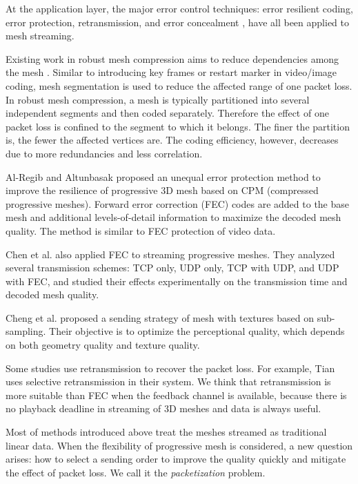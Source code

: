     At the application layer, the major error control techniques: error
    resilient coding, error protection, retransmission, and error
    concealment \cite{Park2003}, have all been applied to mesh streaming.  
    
    Existing work in robust mesh compression aims to
    reduce dependencies among the mesh \cite{error:Park,error:Yan}.
    Similar to introducing key frames or restart marker in video/image
    coding, mesh segmentation is used to reduce the affected range of one
    packet loss. In robust mesh compression, a mesh is typically
    partitioned into several independent segments and then coded separately.
    Therefore the effect of one packet loss is confined to the segment to which
    it belongs. The finer the partition is, the fewer the affected vertices
    are.  The coding efficiency, however, decreases
    due to more redundancies and less correlation.

    Al-Regib and Altunbasak \cite{unequal:Al-Regib} proposed an
    unequal error protection method to improve the resilience of
    progressive 3D mesh based on CPM (compressed progressive meshes). 
    Forward error correction (FEC) codes are added to the
    base mesh and additional levels-of-detail information to maximize 
    the decoded mesh quality.  The method is similar to FEC protection 
    of video data.

    Chen et al. \cite{chen05hybrid} also applied FEC to streaming
    progressive meshes. They analyzed several transmission schemes:
    TCP only, UDP only, TCP with UDP, and UDP with FEC, and studied
    their effects experimentally on the transmission time and decoded
    mesh quality.

    Cheng et al. \cite{loss:cheng} proposed a sending strategy of mesh
    with textures based on sub-sampling. 
    Their objective is to optimize the perceptional quality, which depends 
    on both geometry quality and texture quality. 
    
    Some studies use retransmission to recover the packet loss.
    For example, Tian \cite{Tian2006} uses selective retransmission in their system.
    We think that retransmission is more suitable than FEC when the feedback
    channel is available, because there is no playback deadline in streaming
    of 3D meshes and data is always useful.

    Most of methods introduced above treat the meshes streamed as 
    traditional linear data. When the flexibility of progressive mesh
    is considered, a new question arises: how to select a sending order
    to improve the quality quickly and mitigate the effect of packet loss.
    We call it the \emph{packetization} problem.
    
